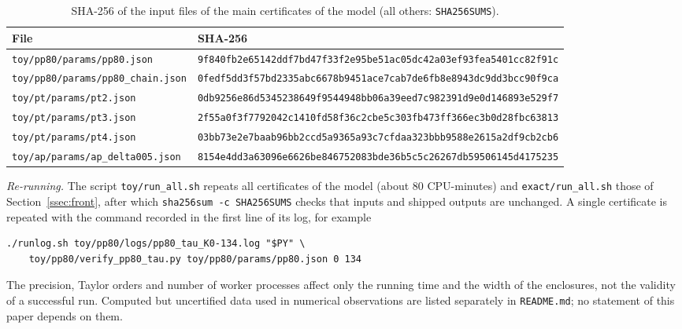 \begin{table}[ht]
\centering\scriptsize
\caption{SHA-256 of the input files of the main certificates of the model (all others: \texttt{SHA256SUMS}).}\label{tab:anc-hashes}
\begin{tabular}{@{}ll@{}}
\toprule
File & SHA-256 \\
\midrule
\nolinkurl{toy/pp80/params/pp80.json} & \texttt{9f840fb2e65142ddf7bd47f33f2e95be51ac05dc42a03ef93fea5401cc82f91c} \\
\nolinkurl{toy/pp80/params/pp80_chain.json} & \texttt{0fedf5dd3f57bd2335abc6678b9451ace7cab7de6fb8e8943dc9dd3bcc90f9ca} \\
\nolinkurl{toy/pt/params/pt2.json} & \texttt{0db9256e86d5345238649f9544948bb06a39eed7c982391d9e0d146893e529f7} \\
\nolinkurl{toy/pt/params/pt3.json} & \texttt{2f55a0f3f7792042c1410fd58f36c2cbe5c303fb473ff366ec3b0d28fbc63813} \\
\nolinkurl{toy/pt/params/pt4.json} & \texttt{03bb73e2e7baab96bb2ccd5a9365a93c7cfdaa323bbb9588e2615a2df9cb2cb6} \\
\nolinkurl{toy/ap/params/ap_delta005.json} & \texttt{8154e4dd3a63096e6626be846752083bde36b5c5c26267db59506145d4175235} \\
\bottomrule
\end{tabular}
\end{table}

\emph{Re-running.} The script \nolinkurl{toy/run_all.sh} repeats all certificates of the model (about $80$ CPU-minutes) and
\nolinkurl{exact/run_all.sh} those of Section~\ref{ssec:front}, after which \texttt{sha256sum -c SHA256SUMS} checks that inputs
and shipped outputs are unchanged. A single certificate is repeated with the command recorded in the first line of its log,
for example
\begin{verbatim}
./runlog.sh toy/pp80/logs/pp80_tau_K0-134.log "$PY" \
    toy/pp80/verify_pp80_tau.py toy/pp80/params/pp80.json 0 134
\end{verbatim}
The precision, Taylor orders and number of worker processes affect only the running time and the width of the
enclosures, not the validity of a successful run. Computed but uncertified data used in numerical observations are
listed separately in \nolinkurl{README.md}; no statement of this paper depends on them.
